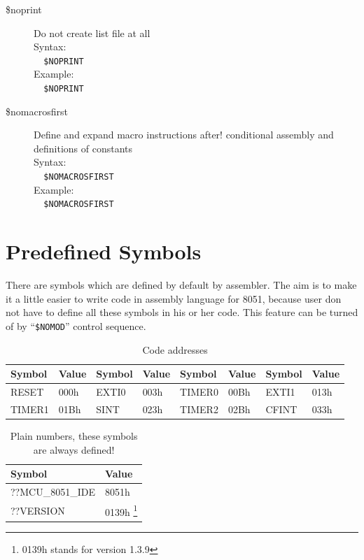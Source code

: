 \documentclass[a4paper,twoside,12pt]{book}
\newcommand{\mysmallfont}{\fontsize{8pt}{10pt} \selectfont{}}
\begin{document}
\begin{description}
			\item[\$noprint] Do not create list file at all\\
				Syntax:\\
				\verb'  '{\color{highlight_control}\verb'$NOPRINT'}\\
				Example:\\
				\verb'  '{\color{highlight_control}\verb'$NOPRINT'}\\
			\item[\$nomacrosfirst] Define and expand macro instructions after! conditional assembly and definitions of constants\\
				Syntax:\\
				\verb'  '{\color{highlight_control}\verb'$NOMACROSFIRST'}\\
				Example:\\
				\verb'  '{\color{highlight_control}\verb'$NOMACROSFIRST'}\\
		\end{description}
		\onecolumn

	\section{Predefined Symbols}
		There are symbols which are defined by default by assembler. The aim is to make it a little easier to write code in assembly language for 8051, because user don not have to define all these symbols in his or her code. This feature can be turned of by ``\texttt{\$NOMOD}'' control sequence.

		\begin{table}[h!]
			\centering{}
			\mysmallfont{}
			\caption{Code addresses}
			\begin{tabular}{|ll|ll|ll|ll|}
				\hline
				\textbf{Symbol}	& \textbf{Value}
					& \textbf{Symbol} & \textbf{Value}
					& \textbf{Symbol} & \textbf{Value}
					& \textbf{Symbol} & \textbf{Value} \\
				\hline
				RESET	& 000h	& EXTI0	& 003h	& TIMER0& 00Bh	& EXTI1	& 013h \\
				TIMER1	& 01Bh	& SINT	& 023h	& TIMER2& 02Bh	& CFINT	& 033h \\
				\hline
			\end{tabular}
		\end{table}

		\begin{table}[h!]
			\centering{}
			\mysmallfont{}
			\caption{Plain numbers, these symbols are always defined!}
			\begin{tabular}{|ll|}
				\hline
				\textbf{Symbol}	& \textbf{Value} \\
				\hline
				??MCU\_8051\_IDE	& 8051h \\
				??VERSION		& 0139h \footnote{0139h stands for version 1.3.9} \\
				\hline
			\end{tabular}
		\end{table}
\end{document}
